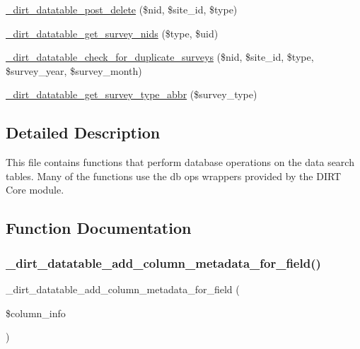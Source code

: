 \begin{DoxyCompactItemize}
\mbox{\hyperlink{dirt__datatable_8search__table__db__ops_8inc_a2bcd5f7a533bc30f5b6f547180f3158c}{\+\_\+dirt\+\_\+datatable\+\_\+post\+\_\+delete}} (\$nid, \$site\+\_\+id, \$type)
\item 
\mbox{\hyperlink{dirt__datatable_8search__table__db__ops_8inc_a7e1fe2884cd3b91ef751e664edc941a2}{\+\_\+dirt\+\_\+datatable\+\_\+get\+\_\+survey\+\_\+nids}} (\$type, \$uid)
\item 
\mbox{\hyperlink{dirt__datatable_8search__table__db__ops_8inc_af3f729b4b71a844cb3351d452678117a}{\+\_\+dirt\+\_\+datatable\+\_\+check\+\_\+for\+\_\+duplicate\+\_\+surveys}} (\$nid, \$site\+\_\+id, \$type, \$survey\+\_\+year, \$survey\+\_\+month)
\item 
\mbox{\hyperlink{dirt__datatable_8search__table__db__ops_8inc_ad19aa2318e72045014c0f1b26f15a482}{\+\_\+dirt\+\_\+datatable\+\_\+get\+\_\+survey\+\_\+type\+\_\+abbr}} (\$survey\+\_\+type)
\end{DoxyCompactItemize}


\subsection{Detailed Description}
This file contains functions that perform database operations on the data search tables. Many of the functions use the db ops wrappers provided by the D\+I\+RT Core module. 

\subsection{Function Documentation}
\mbox{\label{dirt__datatable_8search__table__db__ops_8inc_ab132b2ff441b1a92ac0b3672368a16ad}} 
\subsubsection{\texorpdfstring{\+\_\+dirt\+\_\+datatable\+\_\+add\+\_\+column\+\_\+metadata\+\_\+for\+\_\+field()}{\_dirt\_datatable\_add\_column\_metadata\_for\_field()}}
{\footnotesize\ttfamily \+\_\+dirt\+\_\+datatable\+\_\+add\+\_\+column\+\_\+metadata\+\_\+for\+\_\+field (\begin{DoxyParamCaption}\item[{}]{\$column\+\_\+info }\end{DoxyParamCaption})}


